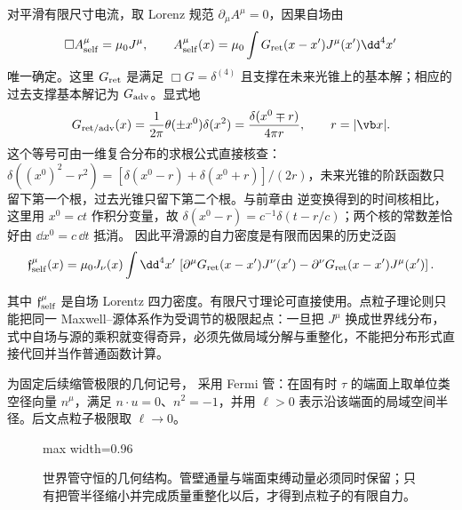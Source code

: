 \begin{definition}[推迟自场与有限尺寸源的自力]
对平滑有限尺寸电流，取 Lorenz 规范 \(\partial_\mu A^\mu=0\)，因果自场由
\[
 \Box A_{\rm self}^\mu=\mu_0J^\mu,
 \qquad
 A_{\rm self}^\mu(x)
 =\mu_0\int G_{\rm ret}(x-x')J^\mu(x')\dd^4x'
\]
唯一确定。这里 \(G_{\rm ret}\) 是满足 \(\Box G=\delta^{(4)}\) 且支撑在未来光锥上的基本解；相应的过去支撑基本解记为 \(G_{\rm adv}\)。显式地
\begin{equation}
 G_{\rm ret/adv}(x)
 =\frac1{2\pi}\theta(\pm x^0)\delta(x^2)
 =\frac{\delta(x^0\mp r)}{4\pi r},
 \qquad r=|\vb x|.
 \label{eq:phys-rr-ret-adv-green}
\end{equation}
这个等号可由一维复合分布的求根公式直接核查：
\(\delta((x^0)^2-r^2)=[\delta(x^0-r)+\delta(x^0+r)]/(2r)\)，未来光锥的阶跃函数只留下第一个根，过去光锥只留下第二个根。与前章由 逆变换得到的时间核相比，这里用 \(x^0=ct\) 作积分变量，故
\(\delta(x^0-r)=c^{-1}\delta(t-r/c)\)；两个核的常数差恰好由 \(\dd x^0=c\,\dd t\) 抵消。
因此平滑源的自力密度是有限而因果的历史泛函
\begin{equation}
 \mathfrak f_{\rm self}^\mu(x)
 =\mu_0J_\nu(x)\int\dd^4x'\,
 \left[
 \partial^\mu G_{\rm ret}(x-x')J^\nu(x')
 -\partial^\nu G_{\rm ret}(x-x')J^\mu(x')
 \right].
 \label{eq:phys-rr-general-self-force-functional}
\end{equation}
\end{definition}
其中 \(\mathfrak f_{\rm self}^\mu\) 是自场 Lorentz 四力密度。有限尺寸理论可直接使用。点粒子理论则只能把同一 Maxwell--源体系作为受调节的极限起点：一旦把 \(J^\mu\) 换成世界线分布，式中自场与源的乘积就变得奇异，必须先做局域分解与重整化，不能把分布形式直接代回并当作普通函数计算。

为固定后续缩管极限的几何记号， 采用 Fermi 管：在固有时 \(\tau\) 的端面上取单位类空径向量 \(n^\mu\)，满足 \(n\cdot u=0\)、\(n^2=-1\)，并用 \(\ell>0\) 表示沿该端面的局域空间半径。后文点粒子极限取 \(\ell\to0\)。

\begin{figure}[htbp]
\centering
\begin{adjustbox}{max width=0.96\linewidth}

\end{adjustbox}
\caption{世界管守恒的几何结构。管壁通量与端面束缚动量必须同时保留；只有把管半径缩小并完成质量重整化以后，才得到点粒子的有限自力。}
\label{fig:phys-rr-worldtube-geometry}
\end{figure}

